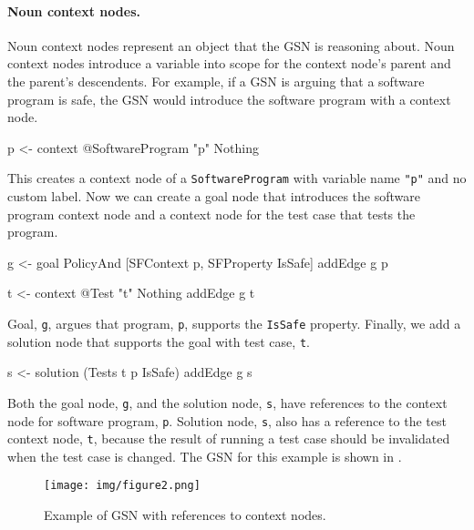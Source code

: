 \documentclass{article}
\begin{document}
\paragraph{Noun context nodes.}
Noun context nodes represent an object that the GSN is reasoning about. 
Noun context nodes introduce a variable into scope for the context node's parent and the parent's descendents. 
For example, if a GSN is arguing that a software program is safe, the GSN would introduce the software program with a context node. 
\begin{mcode}
p <- context @SoftwareProgram "p" Nothing
\end{mcode}
This creates a context node %
of a 
\texttt{SoftwareProgram} with variable name \texttt{"p"} and no custom label. 
% 
Now we can create a goal node that introduces the software program context node and 
a context node for the test case that tests the program. 
\begin{mcode}
g <- goal PolicyAnd [SFContext p, SFProperty IsSafe]
addEdge g p

t <- context @Test "t" Nothing
addEdge g t
\end{mcode}
Goal, \texttt{g}, argues that program, \texttt{p}, supports the \texttt{IsSafe} property. 
%
%
Finally, we add a solution node that supports the goal with test case, \texttt{t}.
\begin{mcode}
s <- solution (Tests t p IsSafe)
addEdge g s
\end{mcode}
Both the goal node, \texttt{g}, and the solution node, \texttt{s}, 
have references to the context node for software program, \texttt{p}.
Solution node, \texttt{s}, also has a reference to the test context node, \texttt{t}, 
because the result of running a test case should be invalidated when the test case is changed.
The GSN for this example is shown in .



\begin{figure}
\centering
\texttt{[image: img/figure2.png]}
\caption{Example of GSN with references to context nodes.}
\label{fig:fig2}
\end{figure}


\end{document}
